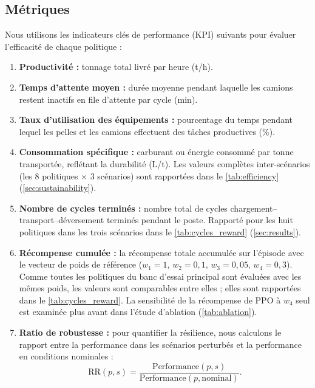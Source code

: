 \documentclass[11pt,a4paper]{article}
\begin{document}
\subsection{Métriques}
\label{sec:metrics}

Nous utilisons les indicateurs clés de performance (KPI) suivants pour évaluer l'efficacité de chaque politique :

\begin{enumerate}
  \item \textbf{Productivité :} tonnage total livré par heure (t/h).
  \item \textbf{Temps d'attente moyen :} durée moyenne pendant laquelle les camions restent inactifs en file d'attente par cycle (min).
  \item \textbf{Taux d'utilisation des équipements :} pourcentage du temps pendant lequel les pelles et les camions effectuent des tâches productives (\%).
  \item \textbf{Consommation spécifique :} carburant ou énergie consommé par tonne transportée, reflétant la durabilité (L/t). Les valeurs complètes inter-scénarios (les 8 politiques $\times$ 3 scénarios) sont rapportées dans le \cref{tab:efficiency} (\cref{sec:sustainability}).
  \item \textbf{Nombre de cycles terminés :} nombre total de cycles chargement--transport--déversement terminés pendant le poste. Rapporté pour les huit politiques dans les trois scénarios dans le \cref{tab:cycles_reward} (\cref{sec:results}).
  \item \textbf{Récompense cumulée :} la récompense totale accumulée sur l'épisode avec le vecteur de poids de référence ($w_1=1,\,w_2=0{,}1,\,w_3=0{,}05,\,w_4=0{,}3$). Comme toutes les politiques du banc d'essai principal sont évaluées avec les mêmes poids, les valeurs sont comparables entre elles ; elles sont rapportées dans le \cref{tab:cycles_reward}. La sensibilité de la récompense de PPO à $w_4$ seul est examinée plus avant dans l'étude d'ablation (\cref{tab:ablation}).
  \item \textbf{Ratio de robustesse :} pour quantifier la résilience, nous calculons le rapport entre la performance dans les scénarios perturbés et la performance en conditions nominales :
  \begin{equation}
  \mathrm{RR}(p,s) = \frac{\mathrm{Performance}(p,s)}{\mathrm{Performance}(p,\mathrm{nominal})} .
  \label{eq:rr}
  \end{equation}
\end{enumerate}
\end{document}
